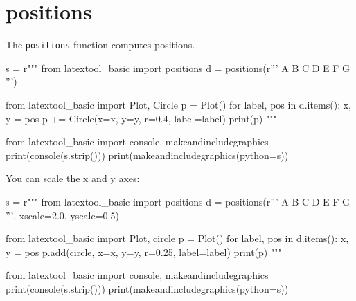\section{positions}

The \verb!positions! function computes positions.
\begin{python}
s = r"""
from latextool_basic import positions
d = positions(r'''
  A
B C D
    E F
G
''')

from latextool_basic import Plot, Circle
p = Plot()
for label, pos in d.items():
    x, y = pos
    p += Circle(x=x, y=y, r=0.4, label=label)
print(p)
"""

from latextool_basic import console, makeandincludegraphics
print(console(s.strip()))
print(makeandincludegraphics(python=s))
\end{python}


You can scale the x and y axes:
\begin{python}
s = r"""
from latextool_basic import positions
d = positions(r'''
  A
B C D
    E F
G
''', xscale=2.0, yscale=0.5)

from latextool_basic import Plot, circle
p = Plot()
for label, pos in d.items():
    x, y = pos
    p.add(circle, x=x, y=y, r=0.25, label=label)
print(p)
"""

from latextool_basic import console, makeandincludegraphics
print(console(s.strip()))
print(makeandincludegraphics(python=s))
\end{python}

